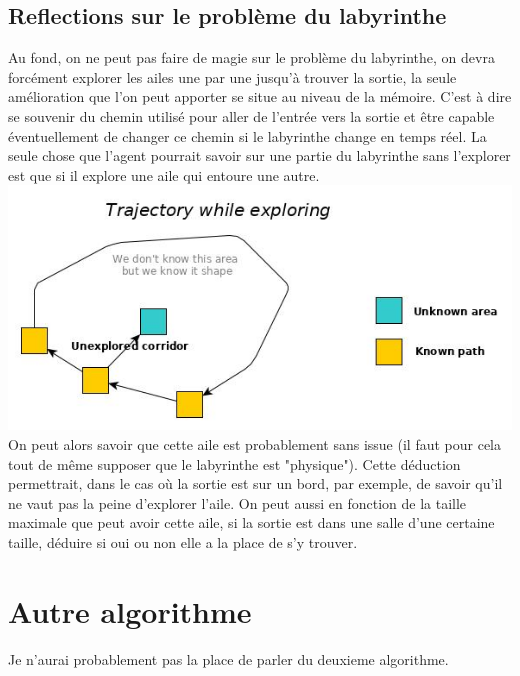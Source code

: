 \documentclass[12pt]{article}
\begin{document}
\subsection{Reflections sur le problème du labyrinthe}
Au fond, on ne peut pas faire de magie sur le problème du labyrinthe, on devra forcément explorer les ailes une par une jusqu'à trouver la sortie, la seule amélioration que l'on peut apporter se situe au niveau de la mémoire. C'est à dire se souvenir du chemin utilisé pour aller de l'entrée vers la sortie et être capable éventuellement de changer ce chemin si le labyrinthe change en temps réel. La seule chose que l'agent pourrait savoir sur une partie du labyrinthe sans l'explorer est que si il explore une aile qui entoure une autre.
\includegraphics[scale=0.5]{ex_shape.jpg}\\
On peut alors savoir que cette aile est probablement sans issue (il faut pour cela tout de même supposer que le labyrinthe est "physique"). Cette déduction permettrait, dans le cas où la sortie est sur un bord, par exemple, de savoir qu'il ne vaut pas la peine d'explorer l'aile. On peut aussi en fonction de la taille maximale que peut avoir cette aile, si la sortie est dans une salle d'une certaine taille, déduire si oui ou non elle a la place de s'y trouver.

\section{Autre algorithme}
Je n'aurai probablement pas la place de parler du deuxieme algorithme.
\end{document}
